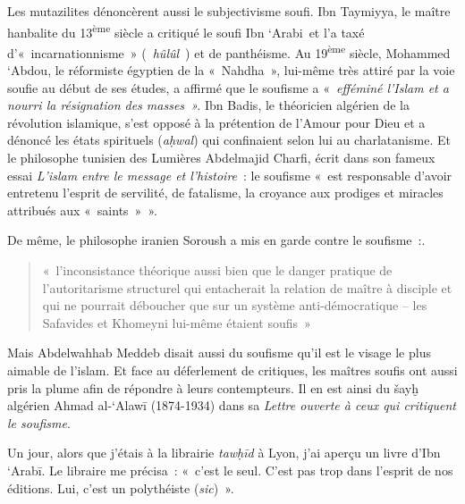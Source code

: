 Les mutazilites dénoncèrent aussi le subjectivisme soufi. Ibn Taymiyya,
le maître hanbalite du 13\textsuperscript{ème} siècle a critiqué le
soufi Ibn `Arabi~et l'a taxé d'«~incarnationnisme~» (~\emph{hûlûl}~) et
de panthéisme. Au 19\textsuperscript{ème} siècle, Mohammed `Abdou, le
réformiste égyptien de la «~Nahdha~», lui-même très attiré par la voie
soufie au début de ses études, a affirmé que le soufisme a
«~\emph{efféminé l'Islam et a nourri la résignation des masses~».} Ibn
Badis, le théoricien algérien de la révolution islamique, s'est opposé à
la prétention de l'Amour pour Dieu et a dénoncé les états spirituels
(\emph{aḥwal}) qui confinaient selon lui au charlatanisme. Et le
philosophe tunisien des Lumières Abdelmajid Charfi, écrit dans son
fameux essai \emph{L'islam entre le message et l'histoire}~: le soufisme
«~est responsable d'avoir entretenu l'esprit de servilité, de fatalisme,
la croyance aux prodiges et miracles attribués aux
«~saints~»~».

De même, le philosophe iranien Soroush a mis en garde contre le
soufisme~:.
\begin{quote}
    «~l'inconsistance théorique aussi bien que le danger pratique
de l'autoritarisme structurel qui entacherait la relation de maître à
disciple et qui ne pourrait déboucher que sur un système
anti-démocratique -- les Safavides et Khomeyni lui-même étaient
soufis~»
\end{quote}

Mais Abdelwahhab Meddeb disait aussi du soufisme qu'il est le visage le
plus aimable de l'islam. Et face au
déferlement de critiques, les maîtres soufis ont aussi pris la plume
afin de répondre à leurs contempteurs. Il en est ainsi du šayḫ algérien
Ahmad al-`Alawī (1874-1934) dans sa \emph{Lettre ouverte à ceux qui
critiquent le soufisme}.

\label{Theo:IbnArabi}
Un jour, alors que j'étais à la librairie \emph{tawḥīd} à Lyon, j'ai
aperçu un livre d'Ibn `Arabī. Le libraire me précisa~: «~c'est le seul.
C'est pas trop dans l'esprit de nos éditions. Lui, c'est un polythéiste
(\emph{sic})~».

